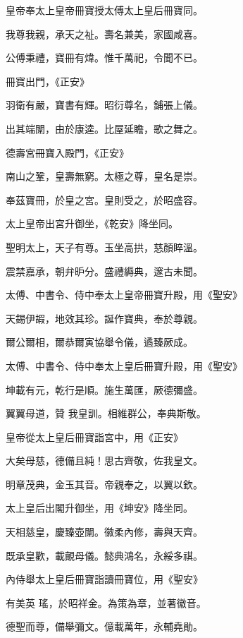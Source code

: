 \begin{pinyinscope}
 皇帝奉太上皇帝冊寶授太傅太上皇后冊寶同。



 我尊我親，承天之祉。壽名兼美，家國咸喜。



 公傅秉禮，寶冊有煒。惟千萬祀，令聞不已。



 冊寶出門，《正安》



 羽衛有嚴，寶書有輝。昭衍尊名，鋪張上儀。



 出其端闈，由於康逵。比屋延瞻，歌之舞之。



 德壽宮冊寶入殿門，《正安》



 南山之鞏，皇壽無窮。太極之尊，皇名是崇。



 奉茲寶冊，於皇之宮。皇則受之，於昭盛容。



 太上皇帝出宮升御坐，《乾安》降坐同。



 聖明太上，天子有尊。玉坐高拱，慈顏睟溫。



 震禁嘉承，朝弁昈分。盛禮縟典，邃古未聞。



 太傅、中書令、侍中奉太上皇帝冊寶升殿，用《聖安》



 天錫伊嘏，地效其珍。誕作寶典，奉於尊親。



 爾公爾相，爾恭爾寅協舉令儀，遹臻厥成。



 太傅、中書令、侍中奉太上皇后冊寶升殿，用《聖安》



 坤載有元，乾行是順。施生萬匯，厥德彌盛。



 翼翼母道，贊
 我皇訓。相維群公，奉典斯敬。



 皇帝從太上皇后冊寶詣宮中，用《正安》



 大矣母慈，德備且純！思古齊敬，佐我皇文。



 明章茂典，金玉其音。帝親奉之，以翼以欽。



 太上皇后出閣升御坐，用《坤安》降坐同。



 天相慈皇，慶臻壺闈。徽柔內修，壽與天齊。



 既承皇歡，載覿母儀。懿典鴻名，永綏多祺。



 內侍舉太上皇后冊寶詣讀冊寶位，用《聖安》



 有美英
 瑤，於昭祥金。為策為章，並著徽音。



 德聖而尊，備舉彌文。億載萬年，永輔堯勛。



\end{pinyinscope}